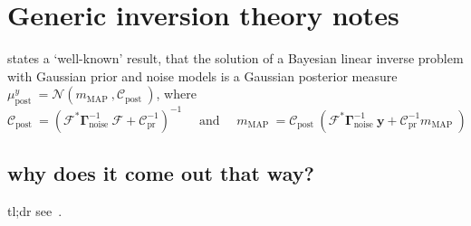 \documentclass{article}
\newcommand{\dist}[1]{\mathcal{#1}}
\begin{document}
\section{Generic inversion theory notes}
\cite{AlexanderianOptimal2021} states a ‘well-known’ result, that the solution of a Bayesian linear inverse problem with Gaussian prior and noise models is a Gaussian posterior measure \(\mu_{\text {post }}^{y}=\dist{N}\left(m_{\text {MAP }}, \mathcal{C}_{\text {post }}\right)\), where
\[
\mathcal{C}_{\text {post }}=\left(\mathcal{F}^{*} \boldsymbol{\Gamma}_{\text {noise }}^{-1} \mathcal{F}+\mathcal{C}_{\text {pr }}^{-1}\right)^{-1} \quad \text { and } \quad m_{\text {MAP }}=\mathcal{C}_{\text {post }}\left(\mathcal{F}^{*} \boldsymbol{\Gamma}_{\text {noise }}^{-1} \boldsymbol{y}+\mathcal{C}_{\text {pr }}^{-1} m_{\text {MAP }}\right)
\]

\subsection{why does it come out that way?}
tl;dr see~\cite{ArrasIntroduction1998}.
\end{document}
